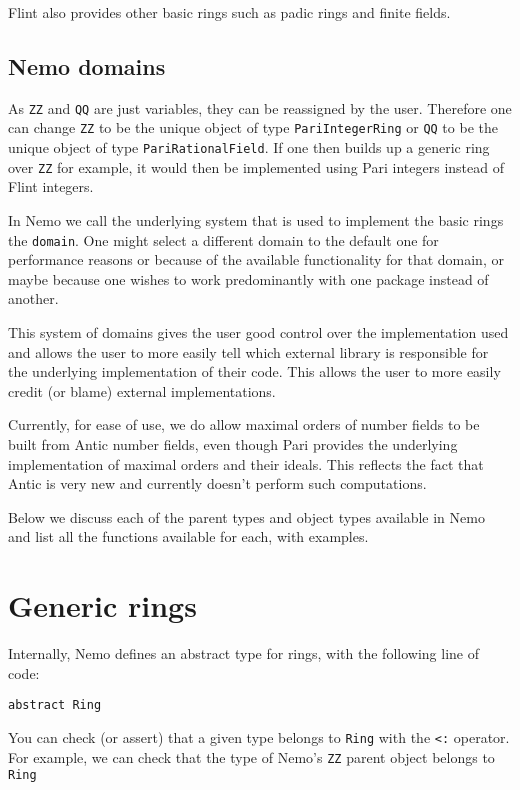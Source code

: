 \documentclass[a4paper,10pt]{article}
\newcommand{\code}{\lstinline}
\begin{document}
Flint also provides other basic rings such as padic rings and finite fields. 

\subsection{Nemo domains}

As \code{ZZ} and \code{QQ} are just variables, they can be reassigned by the user. Therefore one can
change \code{ZZ} to be the unique object of type \code{PariIntegerRing} or \code{QQ} to be the unique
object of type \code{PariRationalField}. If one then builds up a generic ring over \code{ZZ} for
example, it would then be implemented using Pari integers instead of Flint integers.

In Nemo we call the underlying system that is used to implement the basic rings the \code{domain}. One
might select a different domain to the default one for performance reasons or because of the available
functionality for that domain, or maybe because one wishes to work predominantly with one package
instead of another. 

This system of domains gives the user good control over the implementation used and allows the user to
more easily tell which external library is responsible for the underlying implementation of their code.
This allows the user to more easily credit (or blame) external implementations.

Currently, for ease of use, we do allow maximal orders of number fields to be built from Antic number
fields, even though Pari provides the underlying implementation of maximal orders and their ideals. This
reflects the fact that Antic is very new and currently doesn't perform such computations.

Below we discuss each of the parent types and object types available in Nemo and list all the functions
available for each, with examples.

\section{Generic rings}

Internally, Nemo defines an abstract type for rings, with the following line of code:

\begin{lstlisting}
abstract Ring
\end{lstlisting}

You can check (or assert) that a given type belongs to \code{Ring} with the
\code{<:} operator. For example, we can check that the type of Nemo's \code{ZZ} parent object belongs
to \code{Ring}
\end{document}
